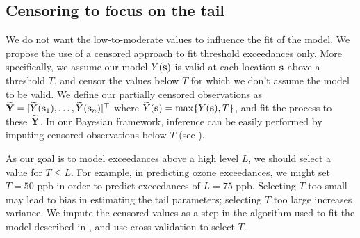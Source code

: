 \documentclass[useAMS,usenatbib,referee]{biom}
\begin{document}
\subsection{Censoring to focus on the tail} \label{sts:censoring}
We do not want the low-to-moderate values to influence the fit of the model.
We propose the use of a censored approach to fit threshold exceedances only.
More specifically, we assume our \skewt model $Y(\mbox{\bf s})$ is valid at each location $\mbox{\bf s}$ above a threshold $T$, and censor the values below $T$ for which we don't assume the model to be valid.
We define our partially censored observations as $\widetilde{\mbox{\bf Y}} = [\widetilde{Y}(\mbox{\bf s}_1), \ldots, \widetilde{Y}(\mbox{\bf s}_n)]^\top$ where $\widetilde{Y}(\mbox{\bf s}) = \max\{Y(\mbox{\bf s}), T\}$, and fit the \skewt process to these $\widetilde{\mbox{\bf Y}}$.
In our Bayesian framework, inference can be easily performed by imputing censored observations below $T$ (see ).

As our goal is to model exceedances above a high level $L$, we should select a value for $T \le L$.
For example, in predicting ozone exceedances, we might set $T = 50$ ppb in order to predict exceedances of $L = 75$ ppb.
Selecting $T$ too small may lead to bias in estimating the tail parameters; selecting $T$ too large increases variance.
We impute the censored values as a step in the algorithm used to fit the model described in , and use cross-validation to select $T$.
\end{document}
